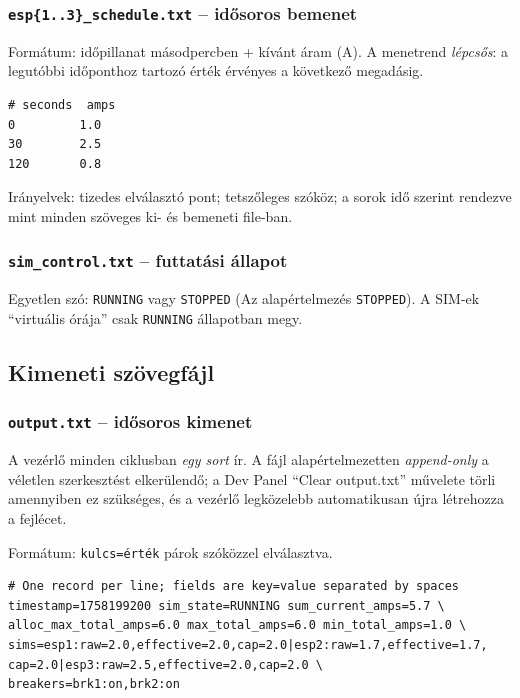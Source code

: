 \subsubsection{\texttt{esp\{1..3\}\_schedule.txt} -- idősoros bemenet}
Formátum: időpillanat másodpercben + kívánt áram (A). A menetrend \emph{lépcsős}: a legutóbbi időponthoz 
tartozó érték érvényes a következő megadásig.
\begin{verbatim}
# seconds  amps
0         1.0
30        2.5
120       0.8
\end{verbatim}
\noindent Irányelvek: tizedes elválasztó pont; tetszőleges szóköz; a sorok idő 
szerint rendezve mint minden szöveges ki- és bemeneti file-ban.

\subsubsection{\texttt{sim\_control.txt} -- futtatási állapot}
Egyetlen szó: \texttt{RUNNING} vagy \texttt{STOPPED} (Az alapértelmezés \texttt{STOPPED}). 
A SIM-ek ``virtuális órája'' csak \texttt{RUNNING} állapotban megy.

\subsection{Kimeneti szövegfájl}

\subsubsection{\texttt{output.txt} -- idősoros kimenet}
A vezérlő minden ciklusban \emph{egy sort} ír. A fájl alapértelmezetten \emph{append-only} 
a véletlen szerkesztést elkerülendő; a Dev Panel ``Clear output.txt'' művelete törli amennyiben ez szükséges, 
és a vezérlő legközelebb automatikusan újra létrehozza a fejlécet.

\noindent Formátum: \texttt{kulcs=érték} párok szóközzel elválasztva.
\begin{verbatim}
# One record per line; fields are key=value separated by spaces
timestamp=1758199200 sim_state=RUNNING sum_current_amps=5.7 \
alloc_max_total_amps=6.0 max_total_amps=6.0 min_total_amps=1.0 \
sims=esp1:raw=2.0,effective=2.0,cap=2.0|esp2:raw=1.7,effective=1.7,
cap=2.0|esp3:raw=2.5,effective=2.0,cap=2.0 \
breakers=brk1:on,brk2:on
\end{verbatim}

